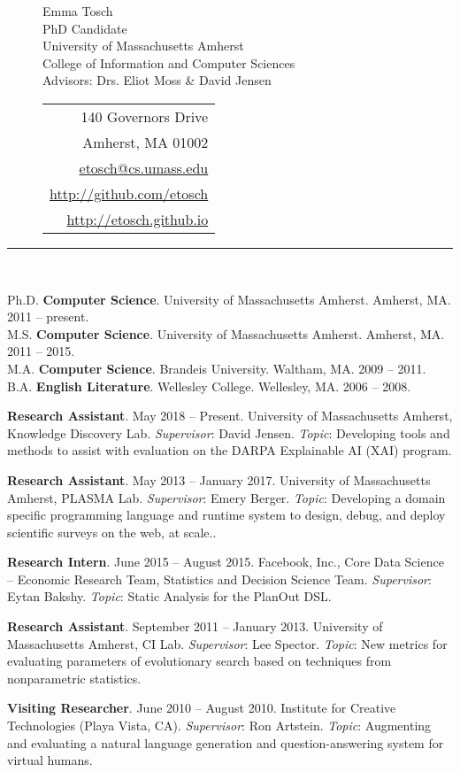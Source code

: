 \documentclass[10pt]{article}
\newcommand{\cvsec}[2]{
    \begin{tcolorbox}[width=\textwidth, breakable, title={#1}]
        #2
    \end{tcolorbox}
    \vspace{10pt}
}
\newcommand{\research}[6]{
  \parbox{\textwidth}{
    \textbf{#1}. #2 -- #3. #4. \newline
    \textit{Supervisor}: #5. \textit{Topic}: #6.
    \vspace{5pt}
  }
}
\newcommand{\umass}{University of Massachusetts Amherst}
\begin{document}
\renewcommand{\arraystretch}{1.2}

\begin{figure*}
\begin{subfigure}{0.75\textwidth}
{\Large \noindent Emma Tosch}		\\
PhD Candidate\\
\umass{}\\
College of Information and Computer Sciences\\
Advisors: Drs. Eliot Moss \& David Jensen
\end{subfigure}
\begin{subfigure}{0.25\textwidth}
\begin{tabular}{r}
140 Governors Drive \\
Amherst, MA 01002\\
\url{etosch@cs.umass.edu}\\
\url{http://github.com/etosch} \\
\url{http://etosch.github.io}\\
\end{tabular}
\end{subfigure}
\rule{\linewidth}{0.3mm}\\
\end{figure*}

\cvsec{Education}{Ph.D. {\bf Computer Science}. \umass{}. Amherst, MA. 2011 -- present.  \\
        M.S. {\bf Computer Science}. \umass{}. Amherst, MA. 2011 -- 2015.\\
        M.A. {\bf Computer Science}. Brandeis University. Waltham, MA. 2009 -- 2011. \\
	B.A. {\bf English Literature}. Wellesley College. Wellesley, MA. 2006 -- 2008.
}

\cvsec{Research Experience}{
  \research{Research Assistant}{May 2018}{Present}{\umass{}, Knowledge Discovery Lab}{David Jensen}{Developing tools and methods to assist with evaluation on the DARPA Explainable  AI (XAI) program}
  \research{Research Assistant}{May 2013}{January 2017}{\umass{}, PLASMA Lab}{Emery Berger}{Developing a domain specific programming language and runtime system to design, debug, and deploy scientific surveys on the web, at scale.}
  \research{Research Intern}{June 2015}{August 2015}{Facebook, Inc., Core Data Science -- Economic Research Team, Statistics and Decision Science Team}{Eytan Bakshy}{Static Analysis for the PlanOut DSL}
  \research{Research Assistant}{September 2011}{January 2013}{\umass{}, CI Lab}{Lee Spector}{New metrics for evaluating parameters of evolutionary search based on techniques from nonparametric statistics}
  \research{Visiting Researcher}{June 2010}{August 2010}{Institute for Creative Technologies (Playa Vista, CA)}{Ron Artstein}{Augmenting and evaluating a natural language generation and question-answering system for virtual humans}
}
\end{document}
